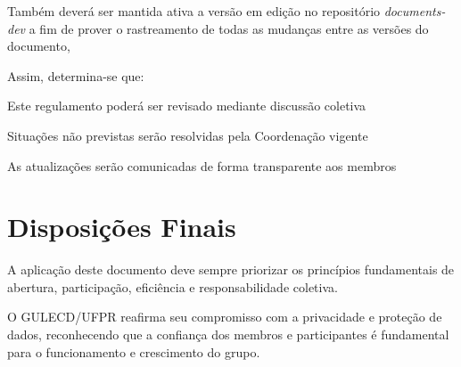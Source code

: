 \documentclass[
  12pt,          %
  a4paper,       %
  oneside,       %
  brazil         %
]{article}
\begin{document}
Também deverá ser mantida ativa a versão em edição no repositório \textit{documents-dev} a fim de prover o rastreamento de todas as mudanças entre as versões do documento,

Assim, determina-se que:
\begin{privacidade}
	\item Este regulamento poderá ser revisado mediante discussão coletiva
	\item Situações não previstas serão resolvidas pela Coordenação vigente
	\item As atualizações serão comunicadas de forma transparente aos membros
\end{privacidade}

\section{Disposições Finais}
A aplicação deste documento deve sempre priorizar os princípios fundamentais de abertura, participação, eficiência e responsabilidade coletiva.

O GULECD/UFPR reafirma seu compromisso com a privacidade e proteção de dados, reconhecendo que a confiança dos membros e participantes é fundamental para o funcionamento 
e crescimento do grupo.


\end{document}
